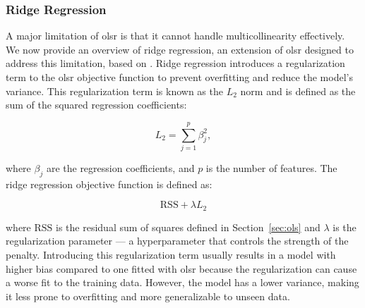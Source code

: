 \subsubsection{Ridge Regression}
A major limitation of \gls{olsr} is that it cannot handle multicollinearity effectively.
We now provide an overview of ridge regression, an extension of \gls{olsr} designed to address this limitation, based on \citet{James2023AnIS}.
Ridge regression introduces a regularization term to the \gls{olsr} objective function to prevent overfitting and reduce the model's variance.
This regularization term is known as the $L_2$ norm and is defined as the sum of the squared regression coefficients:

$$
L_2 = \sum_{j=1}^{p} \beta_j^2,
$$

where $\beta_j$ are the regression coefficients, and $p$ is the number of features.
The ridge regression objective function is defined as:

$$
\text{RSS} + \lambda L_2
$$

where $\text{RSS}$ is the residual sum of squares defined in Section~\ref{sec:ols} and $\lambda$ is the regularization parameter --- a hyperparameter that controls the strength of the penalty.
Introducing this regularization term usually results in a model with higher bias compared to one fitted with \gls{olsr} because the regularization can cause a worse fit to the training data.
However, the model has a lower variance, making it less prone to overfitting and more generalizable to unseen data.